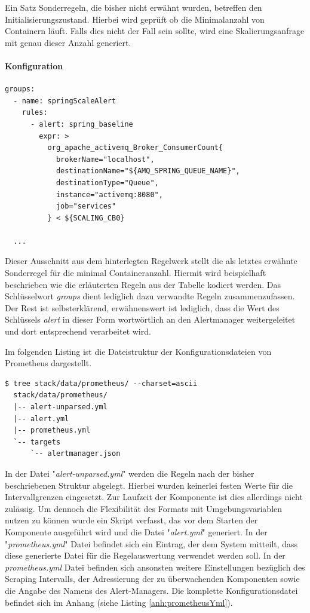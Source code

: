 Ein Satz Sonderregeln, die bisher nicht erwähnt wurden, betreffen den Initialisierungszustand. Hierbei wird geprüft ob die Minimalanzahl von Containern läuft. Falls dies nicht der Fall sein sollte, wird eine Skalierungsanfrage mit genau dieser Anzahl generiert. 


\paragraph{Konfiguration}

\begin{lstlisting}[style=bashStyle,caption={Umgebungsvariablen - Prometheus Regelsatz},label=lst:envMatrix]
  groups:
  - name: springScaleAlert
    rules:
      - alert: spring_baseline
        expr: >
          org_apache_activemq_Broker_ConsumerCount{
            brokerName="localhost",
            destinationName="${AMQ_SPRING_QUEUE_NAME}", 
            destinationType="Queue",
            instance="activemq:8080", 
            job="services"
          } < ${SCALING_CB0} 

  ...

\end{lstlisting}

Dieser Ausschnitt aus dem hinterlegten Regelwerk stellt die als letztes erwähnte Sonderregel für die minimal Containeranzahl. Hiermit wird beispielhaft beschrieben wie die erläuterten Regeln aus der Tabelle kodiert werden. Das Schlüsselwort \emph{groups} dient lediglich dazu verwandte Regeln zusammenzufassen. Der Rest ist selbsterklärend, erwähnenswert ist lediglich, dass die Wert des Schlüssels \emph{alert} in dieser Form wortwörtlich an den Alertmanager weitergeleitet und dort entsprechend verarbeitet wird.

Im folgenden Listing ist die Dateistruktur der Konfigurationsdateien von Prometheus dargestellt.

\begin{lstlisting}[style=bashStyle,caption={Umgebungsvariablen - Prometheus Regelsatz},label=lst:envMatrix]
  $ tree stack/data/prometheus/ --charset=ascii
  stack/data/prometheus/
  |-- alert-unparsed.yml
  |-- alert.yml
  |-- prometheus.yml
  `-- targets
      `-- alertmanager.json
\end{lstlisting}

In der Datei "\emph{alert-unparsed.yml}" werden die Regeln nach der bisher beschriebenen Struktur abgelegt. Hierbei wurden keinerlei festen Werte für die Intervallgrenzen eingesetzt. Zur Laufzeit der Komponente ist dies allerdings nicht zulässig. Um dennoch die Flexibilität des Formats mit Umgebungsvariablen nutzen zu können wurde ein Skript verfasst, das vor dem Starten der Komponente ausgeführt wird und die Datei "\emph{alert.yml}" generiert. In der "\emph{prometheus.yml}" Datei befindet sich ein Eintrag, der dem System mitteilt, dass diese generierte Datei für die Regelauswertung verwendet werden soll. In der \emph{prometheus.yml} Datei befinden sich ansonsten weitere Einstellungen bezüglich des Scraping Intervalls, der Adressierung der zu überwachenden Komponenten sowie die Angabe des Namens des Alert-Managers. Die komplette Konfigurationsdatei befindet sich im Anhang (siehe Listing \ref{anh:prometheusYml}).

